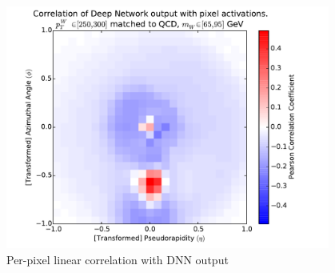 \begin{figure}[!htbp]
  \centering
  \includegraphics[width=0.95\textwidth]{figures/pixel-activations-corr.pdf}
  \caption{Per-pixel linear correlation with DNN output}
  \label{fig:corr}
\end{figure}


